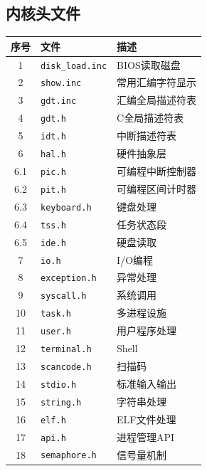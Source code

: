 \documentclass[logo,reportComp]{thesis}
\begin{document}
\subsection{内核头文件}
\begin{center}
\begin{tabular}{|c|l|l|}\hline
\textbf{序号} & \textbf{文件} & \textbf{描述} \\\hline
1 & \verb'disk_load.inc' & BIOS读取磁盘\\\hline
2 & \verb'show.inc' & 常用汇编字符显示\\\hline
3 & \verb'gdt.inc' & 汇编全局描述符表\\\hline
4 & \verb'gdt.h' & C全局描述符表\\\hline
5 & \verb'idt.h' & 中断描述符表\\\hline
6 & \verb'hal.h' & 硬件抽象层\\\hline
6.1 & \verb'pic.h' & 可编程中断控制器\\\hline
6.2 & \verb'pit.h' & 可编程区间计时器\\\hline
6.3 & \verb'keyboard.h' & 键盘处理\\\hline
6.4 & \verb'tss.h' & 任务状态段\\\hline
6.5 & \verb'ide.h' & 硬盘读取\\\hline
7 & \verb'io.h' & I/O编程\\\hline
8 & \verb'exception.h' & 异常处理\\\hline
9 & \verb'syscall.h' & 系统调用\\\hline
10 & \verb'task.h' & 多进程设施\\\hline
11 & \verb'user.h' & 用户程序处理\\\hline
12 & \verb'terminal.h' & Shell\\\hline
13 & \verb'scancode.h' & 扫描码\\\hline
14 & \verb'stdio.h' & 标准输入输出\\\hline
15 & \verb'string.h' & 字符串处理\\\hline
16 & \verb'elf.h' & ELF文件处理\\\hline
17 & \verb'api.h' & 进程管理API\\\hline
18 & \verb'semaphore.h' & 信号量机制\\\hline
\end{tabular}
\end{center}
\end{document}
